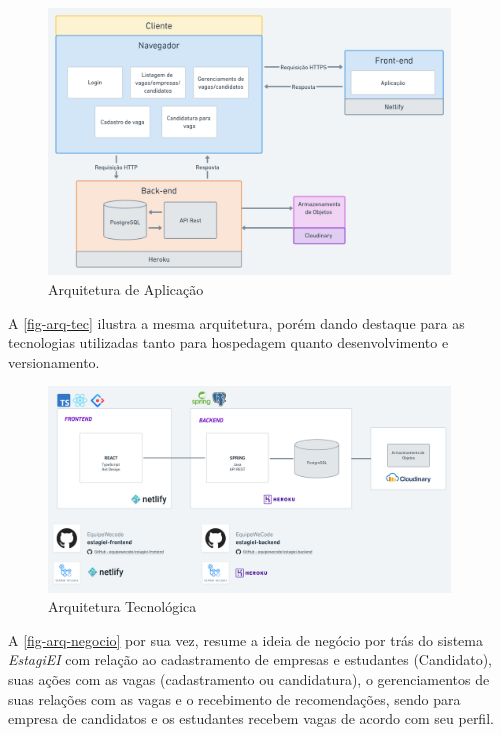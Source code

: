 \begin{figure}[H]
	\centering
	\caption{\label{fig-arq-app}Arquitetura de Aplicação}
	\includegraphics[width=0.95\textwidth]{../imagens/arq-proj-arq-app3.png}
\end{figure}

A \autoref{fig-arq-tec} ilustra a mesma arquitetura, porém dando destaque para as tecnologias utilizadas tanto para hospedagem quanto desenvolvimento e versionamento.

\begin{figure}[H]
	\centering
	\caption{\label{fig-arq-tec}Arquitetura Tecnológica}
	\includegraphics[width=0.95\textwidth]{../imagens/arq-proj-arq-tec4.png}
\end{figure}

A \autoref{fig-arq-negocio} por sua vez, resume a ideia de negócio por trás do sistema \emph{EstagiEI} com relação ao cadastramento de empresas e estudantes (Candidato), suas ações com as vagas (cadastramento ou candidatura), o gerenciamentos de suas relações com as vagas e o recebimento de recomendações, sendo para empresa de candidatos e os estudantes recebem vagas de acordo com seu perfil.

